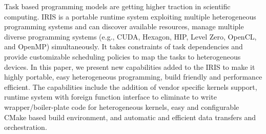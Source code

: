 Task based programming models are getting higher traction in scientific computing. IRIS is a portable runtime system exploiting multiple heterogeneous programming systems and can discover available resources, manage multiple diverse programming systems (e.g., CUDA, Hexagon, HIP, Level Zero, OpenCL, and OpenMP) simultaneously. It takes constraints of task dependencies and provide customizable scheduling policies to map the tasks to heterogeneous devices. In this paper, we present new capabilities added to the IRIS to make it highly portable, easy heterogeneous programming, build friendly and performance efficient. The capabilities include the addition of vendor specific kernels support, runtime system with foreign function interface to eliminate to write wrapper/boiler-plate code for heterogeneous kernels, easy and configurable CMake based build environment, and automatic and efficient data transfers and orchestration.
